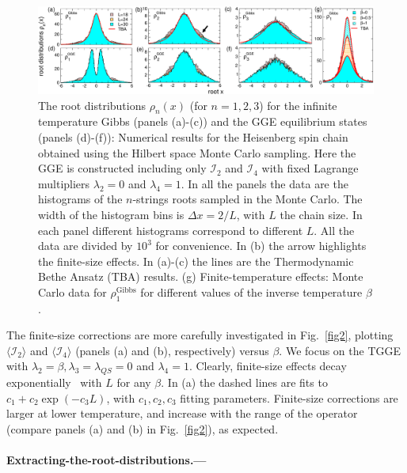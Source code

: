 \documentclass[twocolumn,superscriptaddress,prb,10pt]{revtex4-1}
\begin{document}
\begin{figure}[t]
\includegraphics*[width=0.99\linewidth]{./draft_figs/fig2}
\caption{The root distributions $\rho_n(x)$ (for $n=1,2,3$) for the infinite temperature 
 Gibbs (panels (a)-(c)) and the GGE equilibrium states (panels (d)-(f)): Numerical  
 results for the Heisenberg spin chain obtained using the Hilbert space Monte Carlo 
 sampling. Here the GGE is constructed including only ${\mathcal I}_2$ and ${\mathcal I}_4$ 
 with fixed Lagrange multipliers $\lambda_2=0$ and $\lambda_4=1$. In all the panels the 
 data are the histograms of the $n$-strings roots sampled in the Monte Carlo.
 The width of the histogram bins is $\Delta x=2/L$, with $L$ the chain size. 
 In each panel different histograms correspond to different $L$. All the data are divided 
 by $10^3$ for convenience. In (b) the arrow highlights the finite-size effects. In 
 (a)-(c) the lines are the Thermodynamic Bethe Ansatz (TBA) results. (g) Finite-temperature 
 effects: Monte Carlo data for $\rho^{\textrm{Gibbs}}_1$ for different values of the 
 inverse temperature $\beta$.
}
\label{fig3}
\end{figure}


The finite-size corrections are more carefully investigated in Fig.~\ref{fig2},   
plotting $\langle{\mathcal I}_2\rangle$ and $\langle {\mathcal I}_4
\rangle$ (panels (a) and (b), respectively) versus $\beta$. We focus on 
the TGGE with $\lambda_2=\beta,\lambda_3=\lambda_{QS}=0$ and $\lambda_4=1$. Clearly,  
finite-size effects decay exponentially~\cite{iyer-2015} with $L$ for any $\beta$. In (a) the dashed 
lines are fits to $c_1+c_2\exp(-c_3L)$, with $c_1,c_2,c_3$ fitting parameters. 
Finite-size  corrections are larger at lower temperature, and increase with the 
range of the operator (compare panels  (a) and (b) in Fig.~\ref{fig2}), as expected. 

\paragraph*{Extracting-the-root-distributions.---}
\end{document}
